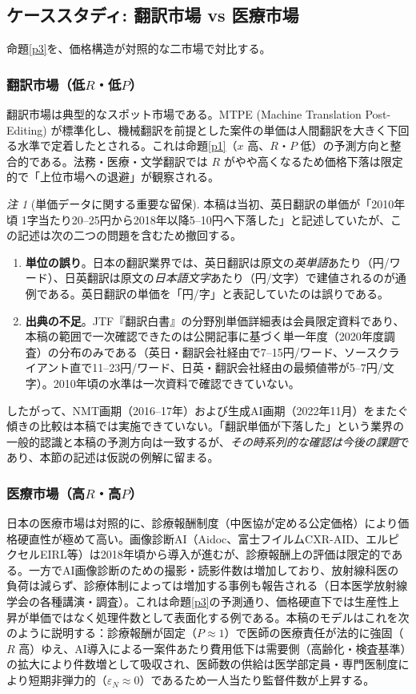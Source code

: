 \documentclass[11pt]{article}
\theoremstyle{plain}
\theoremstyle{definition}
\theoremstyle{remark}
\newtheorem*{rmk}{注}
\begin{document}
\subsection{ケーススタディ: 翻訳市場 vs 医療市場}
命題\ref{p3}を、価格構造が対照的な二市場で対比する。

\subsubsection{翻訳市場（低$R$・低$P$）}
翻訳市場は典型的なスポット市場である。MTPE (Machine Translation Post-Editing) が標準化し、機械翻訳を前提とした案件の単価は人間翻訳を大きく下回る水準で定着したとされる。これは命題\ref{p1}（$x$ 高、$R$・$P$ 低）の予測方向と整合的である。法務・医療・文学翻訳では $R$ がやや高くなるため価格下落は限定的で「上位市場への退避」が観察される。

\begin{rmk}[単価データに関する重要な留保]\label{rmk:jtf}
本稿は当初、英日翻訳の単価が「2010年頃 1字当たり20--25円から2018年以降5--10円へ下落した」と記述していたが、この記述は次の二つの問題を含むため撤回する。
\begin{enumerate}[label=(\roman*),leftmargin=1.8em,itemsep=1pt]
\item \textbf{単位の誤り}。日本の翻訳業界では、英日翻訳は原文の\emph{英単語}あたり（円/ワード）、日英翻訳は原文の\emph{日本語文字}あたり（円/文字）で建値されるのが通例である。英日翻訳の単価を「円/字」と表記していたのは誤りである。
\item \textbf{出典の不足}。JTF『翻訳白書』の分野別単価詳細表は会員限定資料であり、本稿の範囲で一次確認できたのは公開記事に基づく単一年度（2020年度調査）の分布のみである（英日・翻訳会社経由で7--15円/ワード、ソースクライアント直で11--23円/ワード、日英・翻訳会社経由の最頻値帯が5--7円/文字）。2010年頃の水準は一次資料で確認できていない。
\end{enumerate}
したがって、NMT画期（2016--17年）および生成AI画期（2022年11月）をまたぐ傾きの比較は本稿では実施できていない。「翻訳単価が下落した」という業界の一般的認識と本稿の予測方向は一致するが、\emph{その時系列的な確認は今後の課題}であり、本節の記述は仮説の例解に留まる。
\end{rmk}

\subsubsection{医療市場（高$R$・高$P$）}
日本の医療市場は対照的に、診療報酬制度（中医協が定める公定価格）により価格硬直性が極めて高い。画像診断AI（Aidoc、富士フイルムCXR-AID、エルピクセルEIRL等）は2018年頃から導入が進むが、診療報酬上の評価は限定的である。一方でAI画像診断のための撮影・読影件数は増加しており、放射線科医の負荷は減らず、診療体制によっては増加する事例も報告される（日本医学放射線学会の各種講演・調査）。これは命題\ref{p3}の予測通り、価格硬直下では生産性上昇が単価ではなく処理件数として表面化する例である。本稿のモデルはこれを次のように説明する：診療報酬が固定（$P\approx1$）で医師の医療責任が法的に強固（$R$ 高）ゆえ、AI導入による一案件あたり費用低下は需要側（高齢化・検査基準）の拡大により件数増として吸収され、医師数の供給は医学部定員・専門医制度により短期非弾力的（$\varepsilon_N\approx0$）であるため一人当たり監督件数が上昇する。
\end{document}
